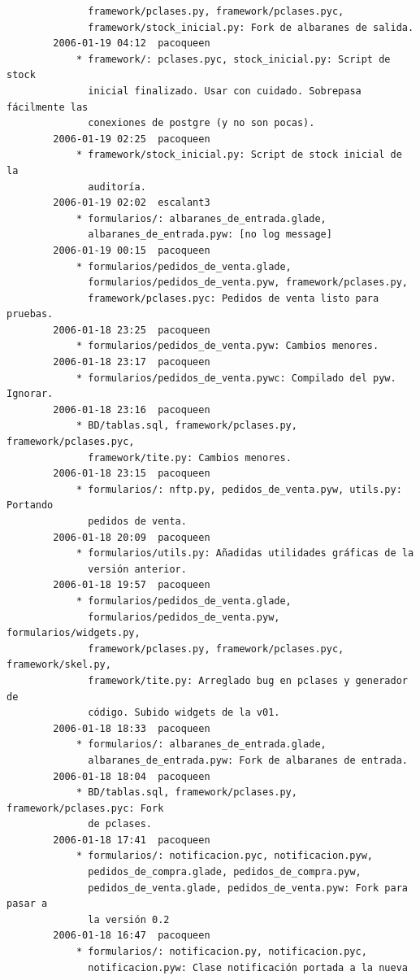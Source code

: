 \documentclass[a4paper]{article}
\begin{document}
\begin{verbatim}
              framework/pclases.py, framework/pclases.pyc,
              framework/stock_inicial.py: Fork de albaranes de salida.
        2006-01-19 04:12  pacoqueen
            * framework/: pclases.pyc, stock_inicial.py: Script de stock
              inicial finalizado. Usar con cuidado. Sobrepasa fácilmente las
              conexiones de postgre (y no son pocas).
        2006-01-19 02:25  pacoqueen
            * framework/stock_inicial.py: Script de stock inicial de la
              auditoría.
        2006-01-19 02:02  escalant3
            * formularios/: albaranes_de_entrada.glade,
              albaranes_de_entrada.pyw: [no log message]
        2006-01-19 00:15  pacoqueen
            * formularios/pedidos_de_venta.glade,
              formularios/pedidos_de_venta.pyw, framework/pclases.py,
              framework/pclases.pyc: Pedidos de venta listo para pruebas.
        2006-01-18 23:25  pacoqueen
            * formularios/pedidos_de_venta.pyw: Cambios menores.
        2006-01-18 23:17  pacoqueen
            * formularios/pedidos_de_venta.pywc: Compilado del pyw. Ignorar.
        2006-01-18 23:16  pacoqueen
            * BD/tablas.sql, framework/pclases.py, framework/pclases.pyc,
              framework/tite.py: Cambios menores.
        2006-01-18 23:15  pacoqueen
            * formularios/: nftp.py, pedidos_de_venta.pyw, utils.py: Portando
              pedidos de venta.
        2006-01-18 20:09  pacoqueen
            * formularios/utils.py: Añadidas utilidades gráficas de la
              versión anterior.
        2006-01-18 19:57  pacoqueen
            * formularios/pedidos_de_venta.glade,
              formularios/pedidos_de_venta.pyw, formularios/widgets.py,
              framework/pclases.py, framework/pclases.pyc, framework/skel.py,
              framework/tite.py: Arreglado bug en pclases y generador de
              código. Subido widgets de la v01.
        2006-01-18 18:33  pacoqueen
            * formularios/: albaranes_de_entrada.glade,
              albaranes_de_entrada.pyw: Fork de albaranes de entrada.
        2006-01-18 18:04  pacoqueen
            * BD/tablas.sql, framework/pclases.py, framework/pclases.pyc: Fork
              de pclases.
        2006-01-18 17:41  pacoqueen
            * formularios/: notificacion.pyc, notificacion.pyw,
              pedidos_de_compra.glade, pedidos_de_compra.pyw,
              pedidos_de_venta.glade, pedidos_de_venta.pyw: Fork para pasar a
              la versión 0.2
        2006-01-18 16:47  pacoqueen
            * formularios/: notificacion.py, notificacion.pyc,
              notificacion.pyw: Clase notificación portada a la nueva

\end{verbatim}
\end{document}
